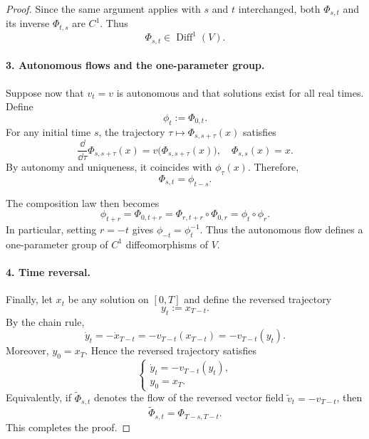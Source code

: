 \documentclass[12pt,a4paper,oneside]{book}
\begin{document}
\begin{proof}
Since the same argument applies with $s$ and $t$ interchanged, both $\Phi_{s,t}$ and its inverse $\Phi_{t,s}$ are $C^1$.
Thus
\begin{equation*}
    \Phi_{s,t}\in\operatorname{Diff}^1(V).
\end{equation*}

\paragraph{3. Autonomous flows and the one-parameter group.}

Suppose now that $v_t=v$ is autonomous and that solutions exist for all real times. Define
\begin{equation*}
    \phi_t:=\Phi_{0,t}.
\end{equation*}
For any initial time $s$, the trajectory $\tau\mapsto\Phi_{s,s+\tau}(x)$ satisfies
\begin{equation*}
    \frac{\dd}{\dd\tau} \Phi_{s,s+\tau}(x) = v\bigl(\Phi_{s,s+\tau}(x)\bigr), \quad
    \Phi_{s,s}(x)=x.
\end{equation*}
By autonomy and uniqueness, it coincides with $\phi_\tau(x)$. Therefore,
\begin{equation*}
\Phi_{s,t}=\phi_{t-s}.
\end{equation*}

The composition law then becomes
\begin{equation*}
    \phi_{t+r}=\Phi_{0,t+r}=\Phi_{r,t+r}\circ\Phi_{0,r}=\phi_t\circ\phi_r.
\end{equation*}
In particular, setting $r=-t$ gives $\phi_{-t}=\phi_t^{-1}$. Thus the autonomous flow defines a one-parameter group of $C^1$
diffeomorphisms of $V$.

\paragraph{4. Time reversal.}

Finally, let $x_t$ be any solution on $[0,T]$ and define the reversed trajectory
\begin{equation*}
    y_t:=x_{T-t}.
\end{equation*}
By the chain rule,
\begin{equation*}
    \dot y_t=-\dot x_{T-t}=-v_{T-t}(x_{T-t})=-v_{T-t}(y_t).
\end{equation*}
Moreover, $y_0=x_T$. Hence the reversed trajectory satisfies
\begin{equation*}
    \begin{cases}
        \dot y_t=-v_{T-t}(y_t),\\
        y_0=x_T.
    \end{cases}
\end{equation*}
Equivalently, if $\widetilde\Phi_{s,t}$ denotes the flow of the reversed vector field $\widetilde v_t=-v_{T-t}$, then
\begin{equation*}
    \widetilde\Phi_{s,t} = \Phi_{T-s,T-t}.
\end{equation*}
This completes the proof.
\end{proof}
\end{document}
